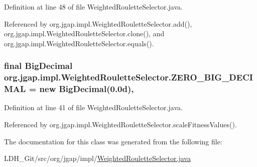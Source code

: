 Definition at line 48 of file Weighted\-Roulette\-Selector.\-java.



Referenced by org.\-jgap.\-impl.\-Weighted\-Roulette\-Selector.\-add(), org.\-jgap.\-impl.\-Weighted\-Roulette\-Selector.\-clone(), and org.\-jgap.\-impl.\-Weighted\-Roulette\-Selector.\-equals().

\hypertarget{classorg_1_1jgap_1_1impl_1_1_weighted_roulette_selector_a7ec7736a02e3288af740a2a129ab6386}{
\subsubsection[{Z\-E\-R\-O\-\_\-\-B\-I\-G\-\_\-\-D\-E\-C\-I\-M\-A\-L}]{\setlength{\rightskip}{0pt plus 5cm}final Big\-Decimal org.\-jgap.\-impl.\-Weighted\-Roulette\-Selector.\-Z\-E\-R\-O\-\_\-\-B\-I\-G\-\_\-\-D\-E\-C\-I\-M\-A\-L = new Big\-Decimal(0.\-0d)\hspace{0.3cm}{\ttfamily [static]}, {\ttfamily [private]}}}\label{classorg_1_1jgap_1_1impl_1_1_weighted_roulette_selector_a7ec7736a02e3288af740a2a129ab6386}


Definition at line 41 of file Weighted\-Roulette\-Selector.\-java.



Referenced by org.\-jgap.\-impl.\-Weighted\-Roulette\-Selector.\-scale\-Fitness\-Values().



The documentation for this class was generated from the following file\-:\begin{DoxyCompactItemize}
\item 
L\-D\-H\-\_\-\-Git/src/org/jgap/impl/\hyperlink{_weighted_roulette_selector_8java}{Weighted\-Roulette\-Selector.\-java}\end{DoxyCompactItemize}
